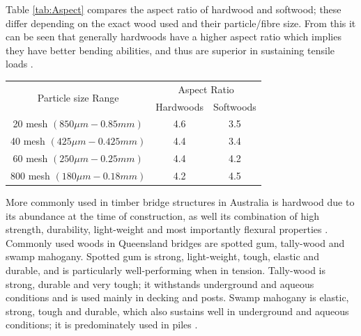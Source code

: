 \documentclass[11pt,a4paper]{article}
\numberwithin{equation}{subsection}
\begin{document}
	
	\noindent
	Table \ref{tab:Aspect} compares the aspect ratio of hardwood and softwood; these differ depending on the exact wood used and their particle/fibre size. From this it can be seen that generally hardwoods have a higher aspect ratio which implies they have better bending abilities, and thus are superior in sustaining tensile loads \cite{klyosov_wood-plastic_2007}. 
	
	\pagebreak
	\begin{center}
		\label{tab:Aspect}
		\begin{tabular}{c c c} 
			\hline
			\multirow{2}{*}{Particle size Range} & \multicolumn{2}{c}{Aspect Ratio} \\
			\cline{2-3}
			
			& Hardwoods & Softwoods \\ [0.5ex] 
			\hline
			20 mesh $(850\mu m - 0.85mm)$ & 4.6 & 3.5 \\ [0.5ex]
			
			40 mesh $(425\mu m - 0.425mm)$ & 4.4 & 3.4 \\ [0.5ex]
			
			60 mesh $(250\mu m - 0.25mm)$ & 4.4 & 4.2 \\ [0.5ex]
			
			800 mesh $(180\mu m - 0.18mm)$ & 4.2 & 4.5 \\ [0.5ex]
			
			\hline
			
		\end{tabular}
	\end{center}
	
	\vspace*{\baselineskip}
	
	\noindent
	More commonly used in timber bridge structures in Australia is hardwood due to its abundance at the time of construction\cite{rta_timber_2000}, as well its combination of high strength, durability, light-weight and most importantly flexural properties \cite{klyosov_wood-plastic_2007}. Commonly used woods in Queensland bridges are spotted gum, tally-wood and swamp mahogany. Spotted gum is strong, light-weight, tough, elastic and durable, and is particularly well-performing when in tension. Tally-wood is strong, durable and very tough; it withstands underground and aqueous conditions and is used mainly in decking and posts. Swamp mahogany is elastic, strong, tough and durable, which also sustains well in underground and aqueous conditions; it is predominately used in piles \cite{_queensland_1899}.
	
\end{document}
